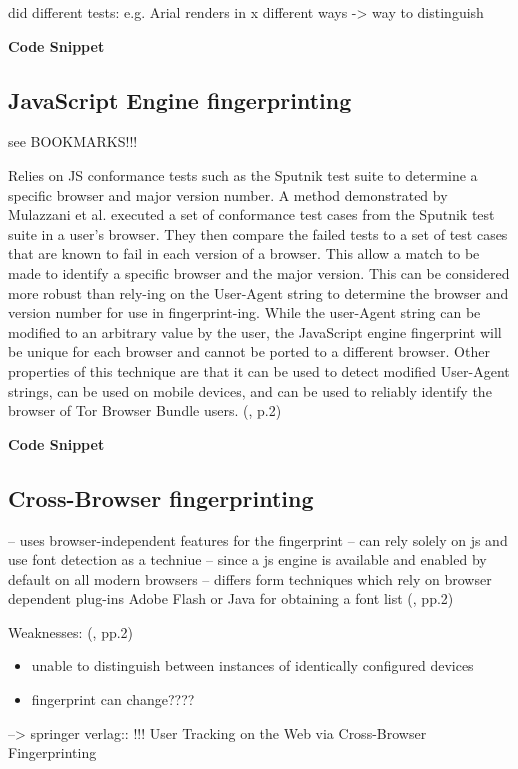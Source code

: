 did different tests:
e.g. Arial renders in x different ways -> way to distinguish

\textbf{Code Snippet}

\subsection{JavaScript Engine fingerprinting}
see BOOKMARKS!!!

Relies on JS conformance tests such as the Sputnik test suite to determine a specific browser and major version number. A method demonstrated by Mulazzani et al. executed a set of conformance test cases from the Sputnik test suite in a user’s browser. They then compare the failed tests to a set of test cases that are known to fail in each version of a browser. This allow a match to be made to identify a specific browser and the major version. This can be considered more robust than rely-ing on the User-Agent string to determine the browser and version number for use in fingerprint-ing. While the user-Agent string can be modified to an arbitrary value by the user, the JavaScript engine fingerprint will be unique for each browser and cannot be ported to a different browser. Other properties of this technique are that it can be used to detect modified User-Agent strings, can be used on mobile devices, and can be used to reliably identify the browser of Tor Browser Bundle users.
 (\textcite{upi15}, p.2)

\textbf{Code Snippet}


\subsection{Cross-Browser fingerprinting}

-- uses browser-independent features for the fingerprint
-- can rely solely on js and use font detection as a techniue
-- since a js engine is available and enabled by default on all modern browsers 
-- differs form techniques which rely on browser dependent plug-ins Adobe Flash or Java for obtaining a font list
(\textcite{upi15}, pp.2)
 
Weaknesses: (\textcite{upi15}, pp.2)
\begin{itemize}
	\item unable to distinguish between instances of identically configured devices
	\item fingerprint can change????
\end{itemize} 
 
 --> springer verlag:: !!!  User Tracking on the Web via Cross-Browser Fingerprinting

